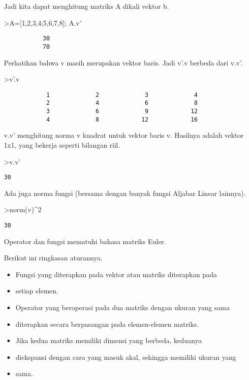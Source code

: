 \documentclass[
]{book}
\begin{document}
Jadi kita dapat menghitung matriks A dikali vektor b.

\textgreater A={[}1,2,3,4;5,6,7,8{]}; A.v'

\begin{verbatim}
           30 
           70 
\end{verbatim}

Perhatikan bahwa v masih merupakan vektor baris. Jadi v'.v berbeda dari v.v'.

\textgreater v'.v

\begin{verbatim}
            1             2             3             4 
            2             4             6             8 
            3             6             9            12 
            4             8            12            16 
\end{verbatim}

v.v' menghitung norma v kuadrat untuk vektor baris v. Hasilnya adalah vektor 1x1, yang bekerja seperti bilangan riil.

\textgreater v.v'

\begin{verbatim}
30
\end{verbatim}

Ada juga norma fungsi (bersama dengan banyak fungsi Aljabar Linear lainnya).

\textgreater norm(v)\^{}2

\begin{verbatim}
30
\end{verbatim}

Operator dan fungsi mematuhi bahasa matriks Euler.

Berikut ini ringkasan aturannya.

\begin{itemize}
\item
  Fungsi yang diterapkan pada vektor atau matriks diterapkan pada
\item
  setiap elemen.
\item
  Operator yang beroperasi pada dua matriks dengan ukuran yang sama
\item
  diterapkan secara berpasangan pada elemen-elemen matriks.
\item
  Jika kedua matriks memiliki dimensi yang berbeda, keduanya
\item
  diekspansi dengan cara yang masuk akal, sehingga memiliki ukuran yang
\item
  sama.
\end{itemize}
\end{document}
